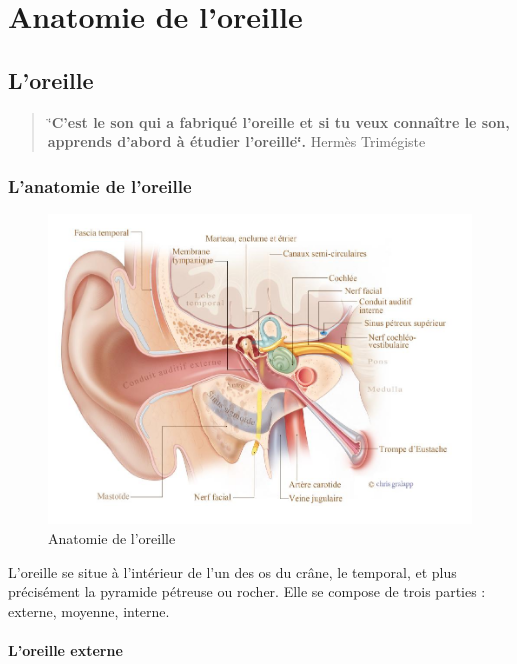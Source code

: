 \chapter {Anatomie de l'oreille}

\section {L'oreille}


\begin{quotation}
	\char`\"{}\textbf{C'est le son qui a fabriqué l'oreille et si tu veux connaître
		le son, apprends d'abord à étudier l\textquoteright oreille\char`\"{}.}
	Hermès Trimégiste 
\end{quotation}

\subsection{L'anatomie de l'oreille}
\begin{figure}
	\centering
	\includegraphics[width=1\linewidth]{images/20160624Berufsfeldgruppen.jpg}
	\caption[Anatomie oreille]{Anatomie de l'oreille}
	\label{fig:-20160624berufsfeldgruppen}
\end{figure}

L'oreille\autocite[ch. 8 pp. 319--321]{marieb:biologie} 
se situe à l'intérieur de l'un des os du crâne, le temporal, et plus précisément la pyramide pétreuse ou rocher. Elle se compose de trois parties : externe, moyenne, interne.

\subsubsection{L'oreille externe}

